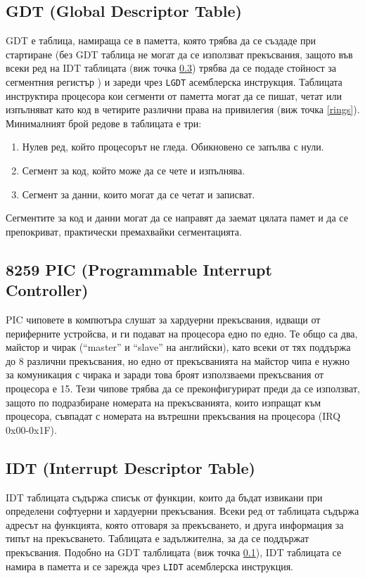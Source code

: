   \subsection{GDT (Global Descriptor Table)} \label{gdt}
  GDT е таблица, намираща се в паметта, която трябва да се създаде при стартиране (без GDT таблица не могат да се използват прекъсвания, защото във всеки ред на IDT таблицата (виж точка \ref{idt}) трябва да се подаде стойност за сегментния регистър \cite[глава~6.11]{intel-manual-3a}) и зареди чрез {\tt LGDT} асемблерска инструкция. Таблицата инструктира процесора кои сегменти от паметта могат да се пишат, четат или изпълняват като код в четирите различни права на привилегия (виж точка \ref{rings}). Минималният брой редове в таблицата е три:
  \begin{enumerate}
    \item Нулев ред, който процесорът не гледа. Обикновено се запълва с нули.
    \item Сегмент за код, който може да се чете и изпълнява.
    \item Сегмент за данни, които могат да се четат и записват.
  \end{enumerate}
  Сегментите за код и данни могат да се направят да заемат цялата памет и да се препокриват, практически премахвайки сегментацията.

  \subsection{8259 PIC (Programmable Interrupt Controller)} \label{pic}
  PIC чиповете в компютъра слушат за хардуерни прекъсвания, идващи от периферните устройсва, и ги подават на процесора едно по едно. Те общо са два, майстор и чирак (``master'' и ``slave'' на английски), като всеки от тях поддържа до 8 различни прекъсвания, но едно от прекъсванията на майстор чипа е нужно за комуникация с чирака и заради това броят използваеми прекъсвания от процесора е 15. Тези чипове трябва да се преконфигурират преди да се използват, защото по подразбиране номерата на прекъсванията, които изпращат към процесора, съвпадат с номерата на вътрешни прекъсвания на процесора (IRQ 0x00-0x1F).

  \subsection{IDT (Interrupt Descriptor Table)} \label{idt}
  IDT таблицата съдържа списък от функции, които да бъдат извикани при определени софтуерни и хардуерни прекъсвания. Всеки ред от таблицата съдържа адресът на функцията, която отговаря за прекъсването, и друга информация за типът на прекъсването. Таблицата е задължителна, за да се поддържат прекъсвания. Подобно на GDT талблицата (виж точка \ref{gdt}), IDT таблицата се намира в паметта и се зарежда чрез {\tt LIDT} асемблерска инструкция.


